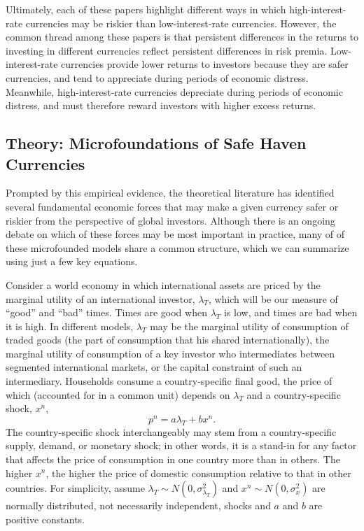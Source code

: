 \documentclass{ar-1col}
\begin{document}

Ultimately, each of these papers highlight different ways in which high-interest-rate currencies may be riskier than low-interest-rate currencies. However, the common thread among these papers is that persistent differences in the returns to investing in different currencies reflect persistent differences in risk premia. Low-interest-rate currencies provide lower returns to investors because they are safer currencies, and tend to appreciate during periods of economic distress. Meanwhile, high-interest-rate currencies depreciate during periods of economic distress, and must therefore reward investors with higher excess returns.



\subsection{Theory: Microfoundations of Safe Haven Currencies}

Prompted by this empirical evidence, the theoretical literature has identified several fundamental economic forces that may make a given currency safer or riskier from the perspective of global investors. Although there is an ongoing debate on which of these forces may be most important in practice, many of of these microfounded models share a common structure, which we can summarize using just a few key equations.

Consider a world economy in which international assets are priced by the marginal utility of an international investor, $\lambda_T$, which will be our measure of ``good'' and ``bad'' times. Times are good when $\lambda_T$ is low, and times are bad when it is high. In different models, $\lambda_T$ may be the marginal utility of consumption of traded goods (the part of consumption that his shared internationally), the marginal utility of consumption of a key investor who intermediates between segmented international markets, or the capital constraint of such an intermediary. Households consume a country-specific final good, the price of which (accounted for in a common unit) depends on $\lambda_T$ and a country-specific shock, $x^n$,
\begin{equation}
  p^{n} = a\lambda_{T} + b x^{n}.  
  \label{eq_RF}
\end{equation}%
The country-specific shock interchangeably may stem from a country-specific supply, demand, or monetary shock; in other words, it is a stand-in for any factor that affects the price of consumption in one country more than in others. The higher $x^{n}$, the higher the price of domestic consumption relative to that in other countries. For simplicity, assume $\lambda _{T}\sim N(0,\sigma^2_{\lambda_{T}})$ and $x^{n} \sim N(0,\sigma^2_x) $ are normally distributed, not necessarily independent, shocks and $a$ and $b$ are positive constants.
\end{document}
